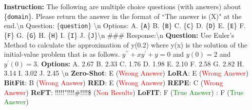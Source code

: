 \begin{tcolorbox}[colback=gray!10!white, colframe=black, title=Case 2: Natural Language Understanding Task (Math) on Qwen-2.5-7B]
    \textbf{Instruction:} The following are multiple choice questions (with answers) about \{\texttt{domain}\}. Please return the answer in the format of ``The answer is (X)" at the end.\textbackslash{}n Question: \{\texttt{question}\} \textbackslash{}n Options: A. \{\texttt{A}\} B. \{\texttt{B}\} C. \{\texttt{C}\} D. \{\texttt{D}\} E. \{\texttt{E}\} F. \{\texttt{F}\} G. \{\texttt{G}\} H. \{\texttt{H}\} I. \{\texttt{I}\} J. \{\texttt{J}\}\textbackslash{}n   \#\#\# Response:\textbackslash{}n \newline
    \textbf{Question:} Use Euler's Method to calculate the approximation of y(0.2) where y(x) is the solution of the initial-value problem that is as follows. $y^{\prime\prime}+xy^{\prime}+y=0$ and $y(0)=2$ and $y^{\prime}(0) = 3$. \newline
    \textbf{Options:} A. 2.67 B. 2.33 C. 1.76 D. 1.98 E. 2.10 F. 2.58 G. 2.82 H. 3.14 I. 3.02 J. 2.45 \textbackslash{}n
    \tcblower
    \textbf{Zero-Shot}: E (\textcolor{red}{Wrong Answer}) \newline
    \textbf{LoRA}: E (\textcolor{red}{Wrong Answer}) \newline
    \textbf{BitFit}: B (\textcolor{red}{Wrong Answer}) \newline
    \textbf{RED}: E (\textcolor{red}{Wrong Answer}) \newline
    \textbf{REPE}: C (\textcolor{red}{Wrong Answer}) \newline
    \textbf{ReFT}: !!!!!"!!!!\#!!!!\$ (\textcolor{red}{Non Results}) \newline
    \textbf{LoFIT}: F (\textcolor{green}{True Answer}) \newline
    \textbf{\jola{}}: F (\textcolor{green}{True Answer})
    \textbf{}
\end{tcolorbox}

